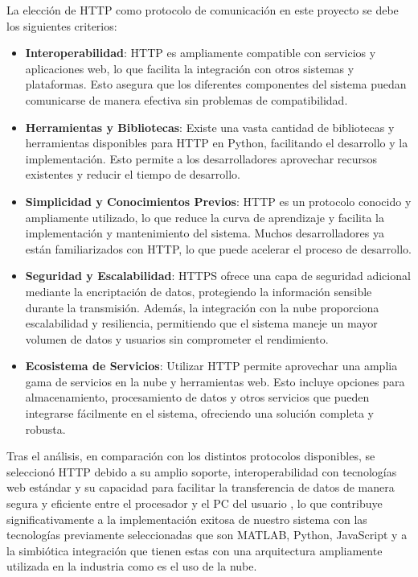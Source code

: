 %
La elección de HTTP como protocolo de comunicación en este proyecto se debe los siguientes criterios:
%
\begin{itemize}
    \item \textbf{Interoperabilidad}: HTTP es ampliamente compatible con servicios y aplicaciones web, lo que facilita la integración con otros sistemas y plataformas. Esto asegura que los diferentes componentes del sistema puedan comunicarse de manera efectiva sin problemas de compatibilidad.
    
    \item \textbf{Herramientas y Bibliotecas}: Existe una vasta cantidad de bibliotecas y herramientas disponibles para HTTP en Python, facilitando el desarrollo y la implementación. Esto permite a los desarrolladores aprovechar recursos existentes y reducir el tiempo de desarrollo.
    
    \item \textbf{Simplicidad y Conocimientos Previos}: HTTP es un protocolo conocido y ampliamente utilizado, lo que reduce la curva de aprendizaje y facilita la implementación y mantenimiento del sistema. Muchos desarrolladores ya están familiarizados con HTTP, lo que puede acelerar el proceso de desarrollo.
    
    \item \textbf{Seguridad y Escalabilidad}: HTTPS ofrece una capa de seguridad adicional mediante la encriptación de datos, protegiendo la información sensible durante la transmisión. Además, la integración con la nube proporciona escalabilidad y resiliencia, permitiendo que el sistema maneje un mayor volumen de datos y usuarios sin comprometer el rendimiento.
    
    \item \textbf{Ecosistema de Servicios}: Utilizar HTTP permite aprovechar una amplia gama de servicios en la nube y herramientas web. Esto incluye opciones para almacenamiento, procesamiento de datos y otros servicios que pueden integrarse fácilmente en el sistema, ofreciendo una solución completa y robusta.
\end{itemize}
%
Tras el análisis, en comparación con los distintos protocolos disponibles, se seleccionó HTTP debido a su amplio soporte, interoperabilidad con tecnologías web estándar y su capacidad para facilitar la transferencia de datos de manera segura y eficiente entre el procesador y el PC del usuario \cite{http}, lo que contribuye significativamente a la implementación exitosa de nuestro sistema con las tecnologías previamente seleccionadas que son MATLAB, Python, JavaScript y a la simbiótica integración que tienen estas con una arquitectura ampliamente utilizada en la industria como es el uso de la nube.
%
